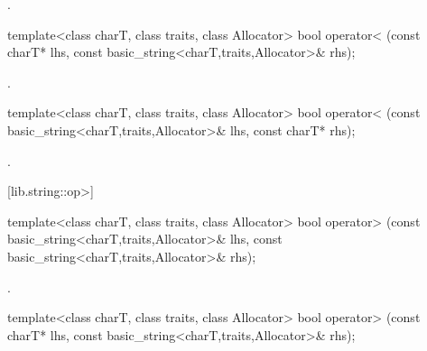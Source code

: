 \begin{itemdescr}
\pnum
\returns
{}.
\end{itemdescr}

%
%
\begin{itemdecl}
template<class charT, class traits, class Allocator>
  bool operator< (const charT* lhs,
                  const basic_string<charT,traits,Allocator>& rhs);
\end{itemdecl}

\begin{itemdescr}
\pnum
\returns
{}.
\end{itemdescr}

%
%
\begin{itemdecl}
template<class charT, class traits, class Allocator>
  bool operator< (const basic_string<charT,traits,Allocator>& lhs,
                  const charT* rhs);
\end{itemdecl}

\begin{itemdescr}
\pnum
\returns
{}.
\end{itemdescr}

[lib.string::op>]{}

%
%
\begin{itemdecl}
template<class charT, class traits, class Allocator>
  bool operator> (const basic_string<charT,traits,Allocator>& lhs,
                  const basic_string<charT,traits,Allocator>& rhs);
\end{itemdecl}

\begin{itemdescr}
\pnum
\returns
{}.
\end{itemdescr}

%
%
\begin{itemdecl}
template<class charT, class traits, class Allocator>
  bool operator> (const charT* lhs,
                  const basic_string<charT,traits,Allocator>& rhs);
\end{itemdecl}

